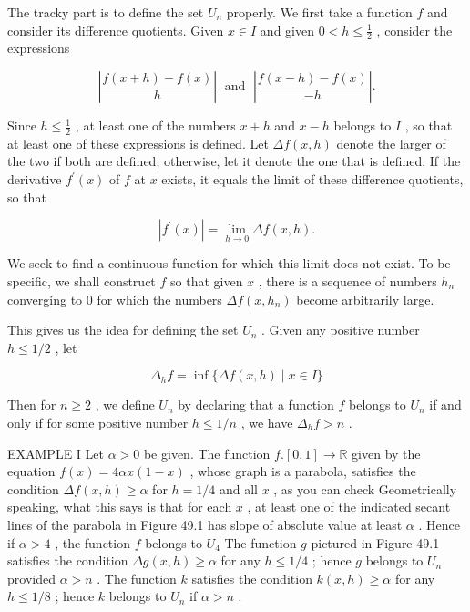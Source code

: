 \documentclass[10pt]{article}
\begin{document}
The tracky part is to define the set \({U}_{n}\) properly. We first take a function \(f\) and consider its difference quotients. Given \(x \in  I\) and given \(0 < h \leq  \frac{1}{2}\) , consider the expressions

\[
\left| \frac{f\left( {x + h}\right)  - f\left( x\right) }{h}\right| \;\text{ and }\;\left| \frac{f\left( {x - h}\right)  - f\left( x\right) }{-h}\right| .
\]

Since \(h \leq  \frac{1}{2}\) , at least one of the numbers \(x + h\) and \(x - h\) belongs to \(I\) , so that at least one of these expressions is defined. Let \({\Delta f}\left( {x,h}\right)\) denote the larger of the two if both are defined; otherwise, let it denote the one that is defined. If the derivative \({f}^{\prime }\left( x\right)\) of \(f\) at \(x\) exists, it equals the limit of these difference quotients, so that

\[
\left| {{f}^{\prime }\left( x\right) }\right|  = \mathop{\lim }\limits_{{h \rightarrow  0}}{\Delta f}\left( {x,h}\right) .
\]

We seek to find a continuous function for which this limit does not exist. To be specific, we shall construct \(f\) so that given \(x\) , there is a sequence of numbers \({h}_{n}\) converging to 0 for which the numbers \({\Delta f}\left( {x,{h}_{n}}\right)\) become arbitrarily large.

This gives us the idea for defining the set \({U}_{n}\) . Given any positive number \(h \leq  1/2\) , let

\[
{\Delta }_{h}f = \inf \{ {\Delta f}\left( {x,h}\right)  \mid  x \in  I\}
\]

Then for \(n \geq  2\) , we define \({U}_{n}\) by declaring that a function \(f\) belongs to \({U}_{n}\) if and only if for some positive number \(h \leq  1/n\) , we have \({\Delta }_{h}f > n\) .

EXAMPLE I Let \(\alpha  > 0\) be given. The function \(f.\left\lbrack  {0,1}\right\rbrack   \rightarrow  \mathbb{R}\) given by the equation \(f\left( x\right)  = {4\alpha x}\left( {1 - x}\right)\) , whose graph is a parabola, satisfies the condition \({\Delta f}\left( {x,h}\right)  \geq  \alpha\) for \(h = 1/4\) and all \(x\) , as you can check Geometrically speaking, what this says is that for each \(x\) , at least one of the indicated secant lines of the parabola in Figure 49.1 has slope of absolute value at least \(\alpha\) . Hence if \(\alpha  > 4\) , the function \(f\) belongs to \({U}_{4}\) The function \(g\) pictured in Figure 49.1 satisfies the condition \({\Delta g}\left( {x,h}\right)  \geq  \alpha\) for any \(h \leq  1/4\) ; hence \(g\) belongs to \({U}_{n}\) provided \(\alpha  > n\) . The function \(k\) satisfies the condition \(k\left( {x,h}\right)  \geq  \alpha\) for any \(h \leq  1/8\) ; hence \(k\) belongs to \({U}_{n}\) if \(\alpha  > n\) .
\end{document}
